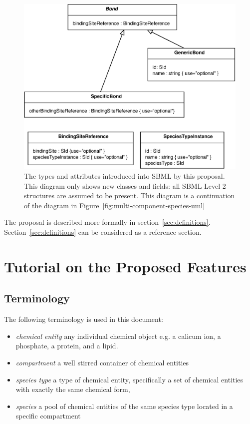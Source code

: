 \documentclass{cekarticle}
\begin{document}
\begin{figure}[h]
  \vspace*{8pt}
  \centering
  \includegraphics[scale = 0.7]{multi-component-species-uml2.eps}
  \caption{The types and attributes introduced into SBML by this proposal.  This diagram
  only shows new classes and fields: all SBML Level 2 structures are assumed to be present.
  This diagram is a continuation of the diagram in Figure~\ref{fig:multi-component-species-uml}}
  \label{fig:multi-component-species-uml2}
\end{figure}

The proposal is described more formally in section~\ref{sec:definitions}.
Section~\ref{sec:definitions} can be considered as a reference section.

\clearpage

\section{Tutorial on the Proposed Features}
\label{sec:tutorial}

\subsection{Terminology}

The following terminology is used in this document:
\begin{itemize}
\item \emph{chemical entity} any individual chemical object
  e.g. a calicum ion, a phosphate, a protein, and a lipid.
  
\item \emph{compartment} a well stirred container of chemical entities
  
\item \emph{species type} a type of chemical entity,
  specifically a set of chemical entities with exactly the same chemical form,
  
\item \emph{species} a pool of chemical entities of the same species type located in a
  specific compartment
\end{itemize}
\end{document}
